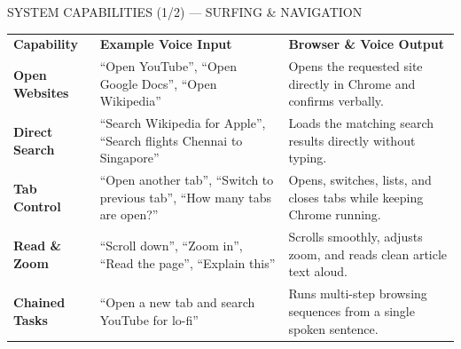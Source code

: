 \documentclass[aspectratio=169,9pt]{beamer}
\begin{document}
\begin{frame}{SYSTEM CAPABILITIES (1/2) --- SURFING \& NAVIGATION}
\renewcommand{\arraystretch}{1.38}
\small
\begin{tabularx}{\textwidth}{@{}p{2.75cm} >{\raggedright\arraybackslash}p{4.65cm} >{\raggedright\arraybackslash}X@{}}
\rowcolor{refSlate}
\textbf{\color{white}Capability} & \textbf{\color{white}Example Voice Input} & \textbf{\color{white}Browser \& Voice Output} \\
\rowcolor{refPage}
\textbf{Open Websites} & ``Open YouTube'', ``Open Google Docs'', ``Open Wikipedia'' & Opens the requested site directly in Chrome and confirms verbally. \\
\rowcolor{refSoft}
\textbf{Direct Search} & ``Search Wikipedia for Apple'', ``Search flights Chennai to Singapore'' & Loads the matching search results directly without typing. \\
\rowcolor{refPage}
\textbf{Tab Control} & ``Open another tab'', ``Switch to previous tab'', ``How many tabs are open?'' & Opens, switches, lists, and closes tabs while keeping Chrome running. \\
\rowcolor{refSoft}
\textbf{Read \& Zoom} & ``Scroll down'', ``Zoom in'', ``Read the page'', ``Explain this'' & Scrolls smoothly, adjusts zoom, and reads clean article text aloud. \\
\rowcolor{refPage}
\textbf{Chained Tasks} & ``Open a new tab and search YouTube for lo-fi'' & Runs multi-step browsing sequences from a single spoken sentence. \\
\hline
\end{tabularx}
\end{frame}
\end{document}
